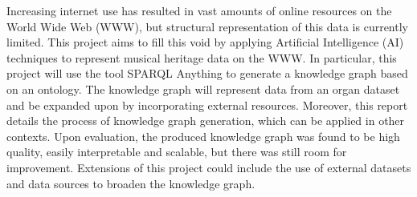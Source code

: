 Increasing internet use has resulted in vast amounts of online resources on the World Wide Web (WWW), but structural representation of this data is currently limited. This project aims to fill this void by applying Artificial Intelligence (AI) techniques to represent musical heritage data on the WWW. In particular, this project will use the tool SPARQL Anything to generate a knowledge graph based on an ontology. The knowledge graph will represent data from an organ dataset and be expanded upon by incorporating external resources. Moreover, this report details the process of knowledge graph generation, which can be applied in other contexts. Upon evaluation, the produced knowledge graph was found to be high quality, easily interpretable and scalable, but there was still room for improvement. Extensions of this project could include the use of external datasets and data sources to broaden the knowledge graph. 
